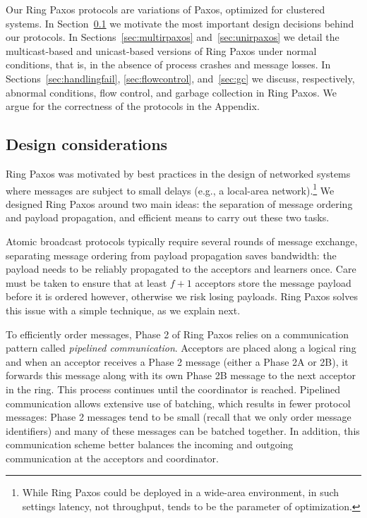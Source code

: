 \documentclass[final,3p,times,twocolumn,authoryear]{elsarticle}
\begin{document}
Our Ring Paxos protocols are variations of Paxos, optimized for clustered systems. 
In Section~\ref{sec:perfcons} we motivate the most important design decisions behind our protocols.
In Sections~\ref{sec:multirpaxos} and~\ref{sec:unirpaxos} we detail the multicast-based and unicast-based versions of Ring Paxos under normal conditions, that is, in the absence of process crashes and message losses. 
In Sections~\ref{sec:handlingfail}, \ref{sec:flowcontrol}, and~\ref{sec:gc} we discuss, respectively, abnormal conditions, flow control, and garbage collection in Ring Paxos. We argue for the correctness of the protocols in the Appendix.


\subsection{Design considerations}
\label{sec:perfcons}
Ring Paxos was motivated by best practices in the design of networked systems where messages are subject to small delays (e.g., a local-area network).\footnote{While Ring Paxos could be deployed in a wide-area environment, in such settings latency, not throughput, tends to be the parameter of optimization.}
We designed Ring Paxos around two main ideas: the separation of message ordering and payload propagation, and  efficient means to carry out these two tasks.  


Atomic broadcast protocols typically require several rounds of message exchange, separating message ordering from payload propagation saves bandwidth: the payload needs to be reliably propagated to the acceptors and learners once.  Care must be taken to ensure that at least $f+1$ acceptors store the message payload before it is ordered however, otherwise we risk losing payloads.  Ring Paxos solves this issue with a simple technique, as we explain next.

To efficiently order messages, Phase 2 of Ring Paxos relies on a communication pattern called {\it pipelined communication}. 
Acceptors are placed along a logical ring and when an acceptor receives a Phase 2 message (either a Phase 2A or 2B), it forwards this message along with its own Phase 2B message to the next acceptor in the ring.
This process continues until the coordinator is reached.
Pipelined communication allows extensive use of batching, which results in fewer protocol messages: Phase 2 messages tend to be small (recall that we only order message identifiers) and many of these messages can be batched together.
In addition, this communication scheme better balances the incoming and outgoing communication at the acceptors and coordinator.
\end{document}
